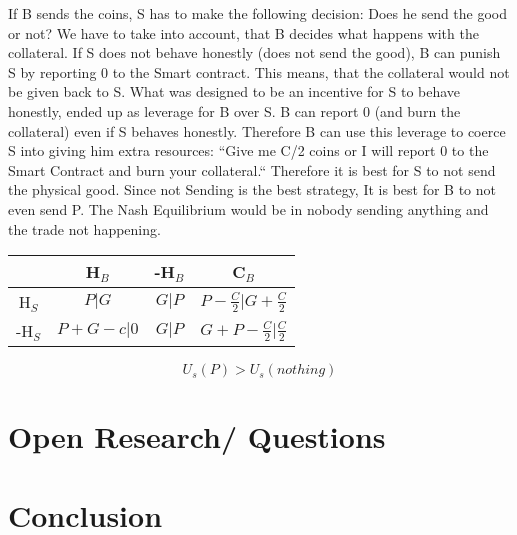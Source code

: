 \documentclass{cacthesis}
\begin{document}
If B sends the coins, S has to make the following decision: Does he send the good or not? We have to take into account, that B decides what happens with the collateral. If S does not behave honestly (does not send the good), B can punish S by reporting 0 to the Smart contract. This means, that the collateral would not be given back to S. What was designed to be an incentive for S to behave honestly, ended up as leverage for B over S. B can report 0 (and burn the collateral) even if S behaves honestly. Therefore B can use this leverage to coerce S into giving him extra resources: “Give me C/2 coins or I will report 0 to the Smart Contract and burn your collateral.“
Therefore it is best for S to not send the physical good.
Since not Sending is the best strategy, It is best for B to not even send P. The Nash Equilibrium would be in nobody sending anything and the trade not happening.
\begin{center}
\begin{tabular}{ c||c|c|c| }
& H$_B$ & -H$_B$ & C$_B$  \\
\hline
\hline
H$_S$ & $P | G$ & $G | P$ & $P- \frac{C}{2} | G + \frac{C}{2}$ \\
\hline
-H$_S$ & $P + G - c | 0$ & $G | P$ & $G + P - \frac{C}{2} | \frac{C}{2}$ \\ 
\hline
\end{tabular}
\end{center}




\begin{equation}
    U_s(P) > U_s(nothing) 
\end{equation}
\newline
\chapter{Open Research/ Questions}

\chapter{Conclusion}
	
	
	
	\appendix
\end{document}
